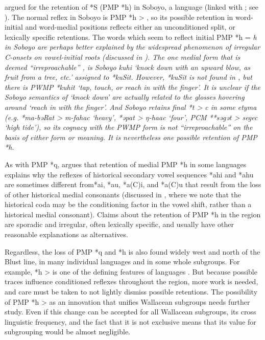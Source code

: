 \citet{Blust1981} argued for the retention of  *S (PMP
*h) in Soboyo, a  language (linked with ; see ).
The normal reflex in Soboyo is PMP *h > {\0},
so its possible retention in word-initial
and word-medial positions reflects either an unconditioned split,
or lexically specific retentions.
The words which seem to reflect initial PMP *h = \it{h} in Soboyo
are perhaps better explained by the widespread phenomenon of
irregular C-onsets on vowel-initial roots (discussed in ).
The one medial form that is deemed “irreproachable” \citep[25]{Blust1981},
is Soboyo \it{kuhi} ‘knock down with an upward blow,
as fruit from a tree,
etc.’ assigned to  *kuSit.
However,  *kuSit is not found in \citet{BlustTrussel2020},
but there is PWMP *kuhit ‘tap,
touch, or reach in with the finger’.
It is unclear if the Soboyo semantics of ‘knock down’ are actually
related to the glosses hovering around ‘reach in with the finger’.
And Soboyo retains final *t > \it{c} in some etyma (e.g.
*ma-bəRat > \it{m-fahac} ‘heavy’,
*əpat > \it{ŋ-haac} ‘four’,
PCM **səgət \it{> segec} ‘high tide’),
so its cognacy with the PWMP form is not “irreproachable” on
the basis of either form or meaning.
It is nevertheless one possible retention of PMP *h.

As with PMP *q,
\citet[41ff]{Collins1983} argues that retention of medial PMP
*h in some  languages explains why the reflexes
of historical secondary vowel sequences *ahi
and *ahu are sometimes different from*ai,
*au, *a(C)i, and *a(C)u that result from the loss of other historical
medial consonants (discussed in ,
where we note that the historical coda may be the conditioning
factor in the vowel shift,
rather than a historical medial consonant).
Claims about the retention of PMP *h in the region are sporadic
and irregular, often lexically specific, and usually have other
reasonable explanations as alternatives.

Regardless, the loss of PMP *q
and *h is also found widely west
and north of the Blust line,
in many individual languages
and in some whole subgroups.
For example, *h > {\0} is one of the defining features of 
languages \citep{Mead2003a}.
But because possible traces influence conditioned reflexes throughout
the region, more work is needed,
and care must be taken to not lightly dismiss possible retentions.
The possibility of PMP *h > {\0} as an innovation that unifies
Wallacean subgroups needs further study.
Even if this change can be accepted for all Wallacean subgroups,
its cross linguistic frequency,
and the fact that it is not exclusive means that its value for
subgrouping would be almost negligible.

